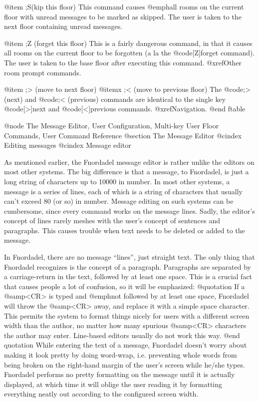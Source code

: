 @item ;S(kip this floor)
This command causes @emph{all} rooms on the current floor with unread
messages to be marked as skipped.  The user is taken to the next
floor containing unread messages.

@item ;Z (forget this floor)
This is a fairly dangerous command, in that it causes all
rooms on the current floor to be forgotten (a la the @code{[Z]forget} command).
The user is taken to the base floor after executing this command.
@xref{Other room prompt commands}.

@item ;> (move to next floor)
@itemx ;< (move to previous floor)
The @code{;> (next)} and @code{;< (previous)} commands are identical to the
single key @code{[>]next} and @code{[<]previous} commands.  @xref{Navigation}.
@end ftable

@node The Message Editor, User Configuration, Multi-key User Floor Commands, User Command Reference
@section The Message Editor
@cindex Editing messages
@cindex Message editor

As mentioned earlier, the Fnordadel message editor is rather unlike
the editors on most other systems.
The big difference is that a message, to Fnordadel, is
just a long string of characters up to 10000 in number.  In most
other systems, a message is a series of lines, each of which is a
string of characters that usually can't exceed 80 (or so) in number.
Message editing on such systems can be cumbersome, since every
command works on the message lines.  Sadly, the editor's concept of
lines rarely meshes with the user's concept of sentences and
paragraphs.  This causes trouble when text needs to be deleted or
added to the message.

In Fnordadel, there are no message ``lines'', just straight
text.  The only thing that Fnordadel recognizes is the
concept of a paragraph.  Paragraphs are separated by a carriage-return in
the text, followed by at least one space.  This is a crucial fact
that causes people a lot of confusion, so it will be emphasized:
@quotation
If a @samp{<CR>} is typed and @emph{not} followed by at least one space,
Fnordadel will throw the @samp{<CR>} away, and replace it with a simple
space character.  This permits the system to format things nicely for users
with a different screen width than the author, no matter how many spurious
@samp{<CR>} characters the author may enter.  Line-based editors usually do
not work this way.
@end quotation
While entering the text of a message, Fnordadel doesn't
worry about making it look pretty by doing word-wrap, i.e.
preventing whole words from being broken on the right-hand margin of
the user's screen while he/she types.  Fnordadel performs no
pretty formatting on
the message until it is actually displayed, at which time it will
oblige the user reading it by formatting everything neatly out
according to the configured screen width.

